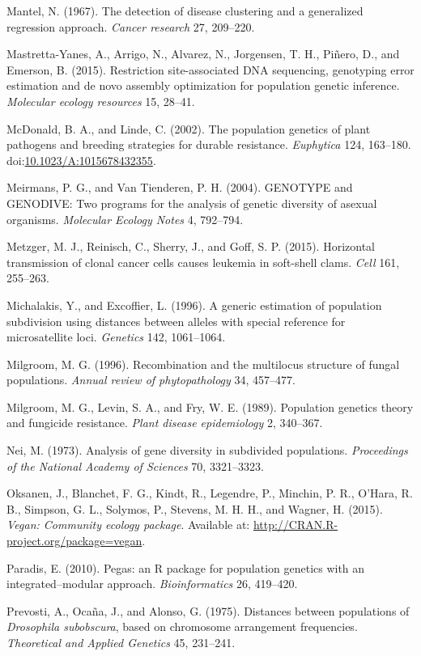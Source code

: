 \documentclass{frontiersSCNS} %
\begin{document}
Mantel, N. (1967). The detection of disease clustering and a generalized
regression approach. \emph{Cancer research} 27, 209--220.

Mastretta-Yanes, A., Arrigo, N., Alvarez, N., Jorgensen, T. H.,
Pi{ñ}ero, D., and Emerson, B. (2015). Restriction site-associated DNA
sequencing, genotyping error estimation and de novo assembly
optimization for population genetic inference. \emph{Molecular ecology
resources} 15, 28--41.

McDonald, B. A., and Linde, C. (2002). The population genetics of plant
pathogens and breeding strategies for durable resistance.
\emph{Euphytica} 124, 163--180.
doi:\href{http://dx.doi.org/10.1023/A:1015678432355}{10.1023/A:1015678432355}.

Meirmans, P. G., and Van Tienderen, P. H. (2004). GENOTYPE and GENODIVE:
Two programs for the analysis of genetic diversity of asexual organisms.
\emph{Molecular Ecology Notes} 4, 792--794.

Metzger, M. J., Reinisch, C., Sherry, J., and Goff, S. P. (2015).
Horizontal transmission of clonal cancer cells causes leukemia in
soft-shell clams. \emph{Cell} 161, 255--263.

Michalakis, Y., and Excoffier, L. (1996). A generic estimation of
population subdivision using distances between alleles with special
reference for microsatellite loci. \emph{Genetics} 142, 1061--1064.

Milgroom, M. G. (1996). Recombination and the multilocus structure of
fungal populations. \emph{Annual review of phytopathology} 34, 457--477.

Milgroom, M. G., Levin, S. A., and Fry, W. E. (1989). Population
genetics theory and fungicide resistance. \emph{Plant disease
epidemiology} 2, 340--367.

Nei, M. (1973). Analysis of gene diversity in subdivided populations.
\emph{Proceedings of the National Academy of Sciences} 70, 3321--3323.

Oksanen, J., Blanchet, F. G., Kindt, R., Legendre, P., Minchin, P. R.,
O'Hara, R. B., Simpson, G. L., Solymos, P., Stevens, M. H. H., and
Wagner, H. (2015). \emph{Vegan: Community ecology package}. Available
at: \url{http://CRAN.R-project.org/package=vegan}.

Paradis, E. (2010). Pegas: an R package for population genetics with an
integrated--modular approach. \emph{Bioinformatics} 26, 419--420.

Prevosti, A., Oca{ñ}a, J., and Alonso, G. (1975). Distances between
populations of \emph{Drosophila subobscura}, based on chromosome
arrangement frequencies. \emph{Theoretical and Applied Genetics} 45,
231--241.
\end{document}
